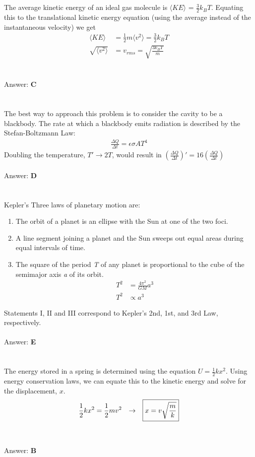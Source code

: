 \documentclass[12pt]{article}
\newcommand{\Answer}[1]{Answer: \textbf{#1}}
\newcommand{\Problem}[3]{
    \setcounter{section}{#1}
    \addtocounter{section}{-1}
    \section{}
    #3\\\\
    \Answer{#2}
}
\begin{document}
\Problem{7}{C}{
The average kinetic energy of an ideal gas molecule is $\langle{KE}\rangle$ = $\frac{3}{2} k_B T$. Equating this to the translational kinetic energy equation (using the average instead of the instantaneous velocity) we get
\begin{align}
\langle{KE}\rangle &= \frac{1}{2}m \langle{v^2}\rangle= \frac{3}{2} k_B T\\
\sqrt{\langle{v^2}\rangle} &= v_{rms} = \boxed{\sqrt{\frac{3 k_B T}{m}}}
\end{align}
}

\Problem{8}{D}{
The best way to approach this problem is to consider the cavity to be a blackbody. The rate at which a blackbody emits radiation is described by the Stefan-Boltzmann Law:
\begin{gather}
\frac{\Delta Q}{\Delta t} = \epsilon \sigma A T^4
\end{gather}
Doubling the temperature, \textit{$T' \rightarrow 2T$}, would result in $\left(\frac{\Delta Q}{\Delta t}\right)' = 16\left(\frac{\Delta Q}{\Delta t}\right)$
}

\Problem{9}{E}{
Kepler's Three laws of planetary motion are:
\begin{enumerate}
\item The orbit of a planet is an ellipse with the Sun at one of the two foci.
\item A line segment joining a planet and the Sun sweeps out equal areas during equal intervals of time.
\item The square of the period \textit{T} of any planet is proportional to the cube of the semimajor axis \textit{a} of its orbit.
\begin{align}
T^2 &= \frac{4\pi^2}{GM}a^3\\
T^2 &\propto a^3
\end{align}
\end{enumerate}
Statements I, II and III correspond to Kepler's 2nd, 1st, and 3rd Law, respectively.
}

\Problem{10}{B}{The energy stored in a spring is determined using the equation $U = \frac{1}{2} k x^2$. Using energy conservation laws, we can equate this to the kinetic energy and solve for the displacement, $x$.
\begin{align}
\frac{1}{2} k x^2 =   \frac{1}{2} m v^2 \hspace{.1in} \rightarrow \hspace{.1in}
\boxed{x=v{\sqrt\frac{m}{k}}}
\end{align}
}
\end{document}
